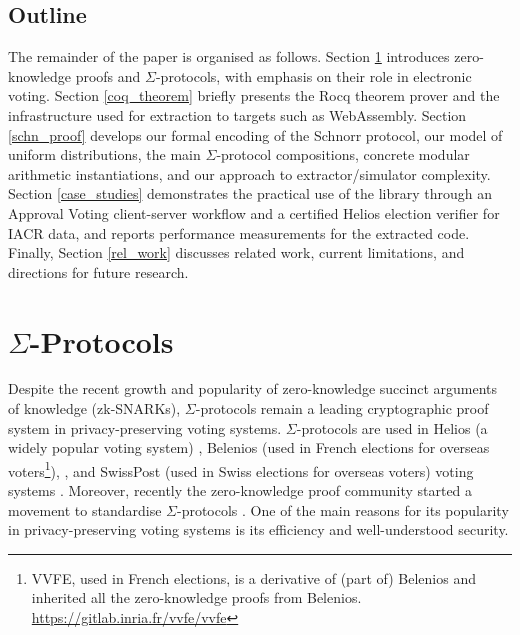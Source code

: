 \documentclass[sigconf,anonymous,review]{acmart}
\begin{document}
\subsection{Outline}
The remainder of the paper is organised as follows. 
Section \ref{sigma_protocol} introduces zero-knowledge proofs and $\Sigma$-protocols, with emphasis on their role in electronic voting. 
Section \ref{coq_theorem} briefly presents the Rocq theorem prover and the infrastructure used for extraction to targets such as WebAssembly. 
Section \ref{schn_proof} develops our formal encoding of the Schnorr protocol, our model of uniform distributions, the main $\Sigma$-protocol compositions, concrete modular arithmetic instantiations, and our approach to extractor/simulator complexity. 
Section \ref{case_studies} demonstrates the practical use of the library through an Approval Voting client-server workflow and a certified Helios election verifier for IACR data, and reports performance measurements for the extracted code. Finally, Section \ref{rel_work} discusses related work, current limitations, and directions for future research.



\section{$\Sigma$-Protocols}\label{sigma_protocol}
Despite the recent growth and popularity of zero-knowledge succinct 
arguments of knowledge (zk-SNARKs), $\Sigma$-protocols remain a
leading cryptographic proof system in privacy-preserving voting systems. 
$\Sigma$-protocols are used in Helios (a widely popular voting system) \cite{adida2008helios}, 
Belenios (used in French elections for overseas 
voters\footnote{VVFE, used in French elections, is a derivative of (part of) Belenios and 
inherited all the zero-knowledge proofs from Belenios. \url{https://gitlab.inria.fr/vvfe/vvfe}}), \cite{cortier2023french}, and 
SwissPost (used in Swiss elections for overseas voters) voting 
systems \cite{10.1007/978-3-031-15911-4_4}. 
Moreover, recently the zero-knowledge proof community started a movement to standardise
$\Sigma$-protocols \cite{ZKProof}.
One of the main reasons for its popularity in privacy-preserving voting systems is its
efficiency and well-understood security.
\end{document}
